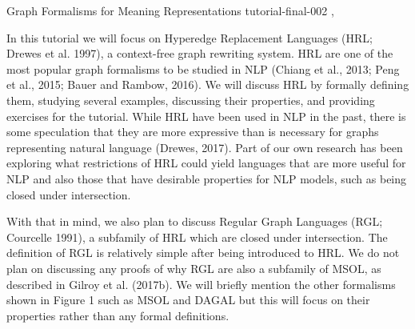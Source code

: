 \begin{tutorial}
  {Graph Formalisms for Meaning Representations}
  {tutorial-final-002}
  {, \tutorialmorningtime}
  {\TutLocB}

In this tutorial we will focus on Hyperedge Replacement Languages (HRL; Drewes et al. 1997), a context-free graph rewriting system. HRL are one of the most popular graph formalisms to be studied in NLP (Chiang et al., 2013; Peng et al., 2015; Bauer and Rambow, 2016). We will discuss HRL by formally defining them, studying several examples, discussing their properties, and providing exercises for the tutorial. While HRL have been used in NLP in the past, there is some speculation that they are more expressive than is necessary for graphs representing natural language (Drewes, 2017). Part of our own research has been exploring what restrictions of HRL could yield languages that are more useful for NLP and also those that have desirable properties for NLP models, such as being closed under intersection.

With that in mind, we also plan to discuss Regular Graph Languages (RGL; Courcelle 1991), a subfamily of HRL which are closed under intersection. The definition of RGL is relatively simple after being introduced to HRL. We do not plan on discussing any proofs of why RGL are also a subfamily of MSOL, as described in Gilroy et al. (2017b). We will briefly mention the other formalisms shown in Figure 1 such as MSOL and DAGAL but this will focus on their properties rather than any formal definitions.

\end{tutorial}
